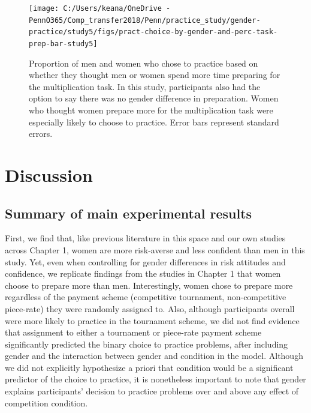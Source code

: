\documentclass[a4paper, nobind]{templates/ociamthesis}
\begin{document}
\begin{figure}

{\centering \texttt{[image: C:/Users/keana/OneDrive - PennO365/Comp\_transfer2018/Penn/practice\_study/gender-practice/study5/figs/pract-choice-by-gender-and-perc-task-prep-bar-study5]} 

}

\caption{Proportion of men and women who chose to practice based on whether they thought men or women spend more time preparing for the multiplication task. In this study, participants also had the option to say there was no gender difference in preparation. Women who thought women prepare more for the multiplication task were especially likely to choose to practice. Error bars represent standard errors.}\label{fig:pract-choice-by-gender-and-perc-task-prep-bar-study5}
\end{figure}

\hypertarget{discussion-3}{%
\section{Discussion}\label{discussion-3}}

\hypertarget{summary-of-main-experimental-results-3}{%
\subsection{Summary of main experimental results}\label{summary-of-main-experimental-results-3}}

First, we find that, like previous literature in this space and our own studies across Chapter 1, women are more risk-averse and less confident than men in this study. Yet, even when controlling for gender differences in risk attitudes and confidence, we replicate findings from the studies in Chapter 1 that women choose to prepare more than men. Interestingly, women chose to prepare more regardless of the payment scheme (competitive tournament, non-competitive piece-rate) they were randomly assigned to. Also, although participants overall were more likely to practice in the tournament scheme, we did not find evidence that assignment to either a tournament or piece-rate payment scheme significantly predicted the binary choice to practice problems, after including gender and the interaction between gender and condition in the model. Although we did not explicitly hypothesize a priori that condition would be a significant predictor of the choice to practice, it is nonetheless important to note that gender explains participants' decision to practice problems over and above any effect of competition condition.
\end{document}
